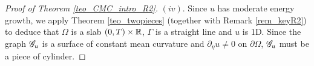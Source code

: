 \documentclass[10 pt,a4paper]{article}
\theoremstyle{definition}
\begin{document}
\begin{proof}[Proof of Theorem \ref{teo_CMC_intro_R2}]
	$(iv)$. %
	Since $u$ has moderate energy growth, we apply Theorem \ref{teo_twopieces} (together with Remark \ref{rem_keyR2}) to deduce that $\Omega$ is a slab $(0,T) \times \mathbb R$, $\Gamma$ is a straight line and $u$ is 1D. Since the graph $\mathscr{G}_u$ is a surface of constant mean curvature and $\partial_\eta u\neq0$ on $\partial \Omega$, $\mathscr{G}_u$ must be a piece of cylinder.
	

\end{proof}
\end{document}
